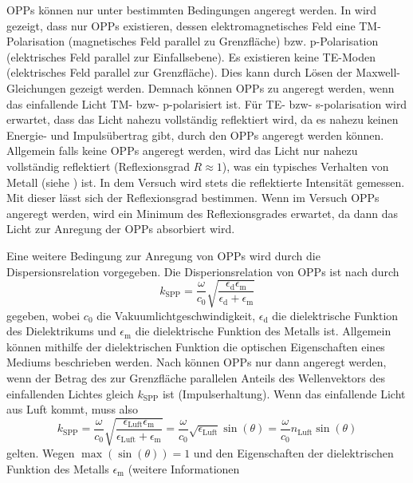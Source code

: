 OPPs können nur unter bestimmten Bedingungen angeregt werden. In \cite{nano} wird gezeigt, dass nur OPPs existieren, dessen elektromagnetisches Feld eine TM-Polarisation (magnetisches Feld
parallel zu Grenzfläche) bzw. p-Polarisation (elektrisches Feld parallel zur Einfallsebene). Es existieren keine TE-Moden (elektrisches Feld parallel zur Grenzfläche).
Dies kann durch Lösen der Maxwell-Gleichungen gezeigt werden. Demnach können OPPs zu angeregt werden, wenn das einfallende Licht TM- bzw- p-polarisiert ist. Für
TE- bzw- s-polarisation wird erwartet, dass das Licht nahezu vollständig reflektiert wird, da es nahezu keinen Energie- und Impulsübertrag gibt, durch den OPPs
angeregt werden können. Allgemein falls keine OPPs angeregt werden, wird das Licht nur nahezu vollständig reflektiert (Reflexionsgrad $R \approx 1$), was ein typisches
Verhalten von Metall (siehe \cite{linden_optik}) ist. In dem Versuch wird stets die reflektierte Intensität gemessen. Mit dieser lässt sich der Reflexionsgrad bestimmen.
Wenn im Versuch OPPs angeregt werden, wird ein Minimum des Reflexionsgrades erwartet, da dann das Licht zur Anregung der OPPs absorbiert wird.\par
Eine weitere Bedingung zur Anregung von OPPs wird durch die Dispersionsrelation vorgegeben. Die Disperionsrelation von OPPs ist nach \cite{linden_optik} durch
\begin{equation*}\label{eq:k_spp}
    k_{\mathrm{SPP}} = \frac{\omega}{c_0} \sqrt{\frac{\epsilon_{\mathrm{d}}\epsilon_{\mathrm{m}}}{\epsilon_{\mathrm{d}} + \epsilon_{\mathrm{m}}}}
\end{equation*} gegeben, wobei $c_0$ die Vakuumlichtgeschwindigkeit, $\epsilon_{\mathrm{d}}$ die dielektrische Funktion des Dielektrikums und $\epsilon_{\mathrm{m}}$
die dielektrische Funktion des Metalls ist. Allgemein können mithilfe der dielektrischen Funktion die optischen Eigenschaften eines Mediums beschrieben werden.
Nach \cite{linden_photonics} können OPPs nur dann angeregt werden, wenn der Betrag des zur Grenzfläche parallelen Anteils des Wellenvektors des einfallenden Lichtes
gleich $k_{\mathrm{SPP}}$ ist (Impulserhaltung). Wenn das einfallende Licht aus Luft kommt, muss also
\begin{equation*}
    k_{\mathrm{SPP}} = \frac{\omega}{c_0}\sqrt{\frac{\epsilon_{\mathrm{Luft}}\epsilon_{\mathrm{m}}}{\epsilon_{\mathrm{Luft}} + \epsilon_{\mathrm{m}}}} = \frac{\omega}{c_0}\sqrt{\epsilon_{\mathrm{Luft}}} \sin(\theta) = \frac{\omega}{c_0}n_{\mathrm{Luft}} \sin(\theta)
\end{equation*} gelten. Wegen $\max(\sin(\theta)) = 1$ und den Eigenschaften der dielektrischen Funktion des Metalls $\epsilon_{\mathrm{m}}$ (weitere Informationen
